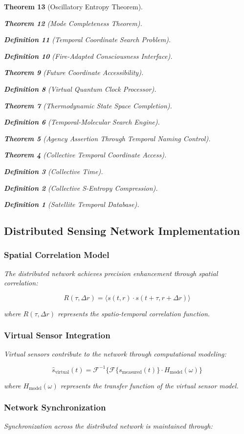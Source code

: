 \documentclass[12pt,a4paper]{article}
\newtheorem{theorem}{Theorem}[section]
\newtheorem{definition}[theorem]{Definition}
\begin{document}
\begin{theorem}[Oscillatory Entropy Theorem]
\begin{theorem}[Mode Completeness Theorem]
\begin{enumerate}
\begin{definition}[Temporal Coordinate Search Problem]
\begin{algorithm}
\begin{definition}[Fire-Adapted Consciousness Interface]
\begin{theorem}[Future Coordinate Accessibility]
\begin{definition}[Virtual Quantum Clock Processor]
\begin{itemize}
\begin{itemize}
\begin{theorem}[Thermodynamic State Space Completion]
\begin{definition}[Temporal-Molecular Search Engine]
\begin{theorem}[Agency Assertion Through Temporal Naming Control]
\begin{remark}
\begin{theorem}[Collective Temporal Coordinate Access]
\begin{definition}[Collective Time]
\begin{definition}[Collective S-Entropy Compression]
\begin{definition}[Satellite Temporal Database]
\begin{algorithm}
\begin{table}[h]
{{\subsection{Distributed Sensing Network Implementation}

\subsubsection{Spatial Correlation Model}

The distributed network achieves precision enhancement through spatial correlation:

\begin{equation}
R(\tau, \Delta r) = \langle s(t, r) \cdot s(t + \tau, r + \Delta r) \rangle
\end{equation}

where $R(\tau, \Delta r)$ represents the spatio-temporal correlation function.

\subsubsection{Virtual Sensor Integration}

Virtual sensors contribute to the network through computational modeling:

\begin{equation}
\hat{s}_{\text{virtual}}(t) = \mathcal{F}^{-1}\{\mathcal{F}\{s_{\text{measured}}(t)\} \cdot H_{\text{model}}(\omega)\}
\end{equation}

where $H_{\text{model}}(\omega)$ represents the transfer function of the virtual sensor model.

\subsubsection{Network Synchronization}

Synchronization across the distributed network is maintained through:

}}
\end{table}
\end{algorithm}
\end{definition}
\end{definition}
\end{definition}
\end{theorem}
\end{remark}
\end{theorem}
\end{definition}
\end{theorem}
\end{itemize}
\end{itemize}
\end{definition}
\end{theorem}
\end{definition}
\end{algorithm}
\end{definition}
\end{enumerate}
\end{theorem}
\end{theorem}
\end{document}
